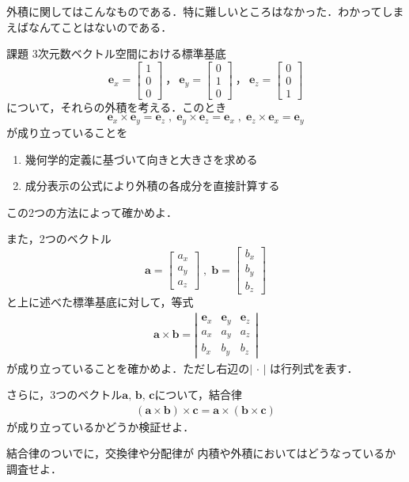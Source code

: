 外積に関してはこんなものである．特に難しいところはなかった．わかってしまえばなんてことはないのである．
\begin{itembox}[l]{課題}
3次元数ベクトル空間における標準基底
$$
\bm{e}_x = \left[
 \begin{array}{c}
 1 \\
 0 \\
 0 
 \end{array}
\right]
\: ，\: 
\bm{e}_y = \left[
 \begin{array}{c}
 0 \\
 1 \\
 0 
 \end{array}
\right]
\: ，\: 
\bm{e}_z = \left[
 \begin{array}{c}
 0 \\
 0 \\
 1 
 \end{array}
\right]
$$
について，それらの外積を考える．このとき
$$
\bm{e}_x \times \bm{e}_y = \bm{e}_z \; , \; 
\bm{e}_y \times \bm{e}_z = \bm{e}_x \; , \; 
\bm{e}_z \times \bm{e}_x = \bm{e}_y 
$$
が成り立っていることを
\begin{enumerate}
\item 幾何学的定義に基づいて向きと大きさを求める
\item 成分表示の公式により外積の各成分を直接計算する 
\end{enumerate}
この2つの方法によって確かめよ．

また，2つのベクトル
$$
\bm{a} = \left[
 \begin{array}{c}
  a_x \\ 
  a_y \\
  a_z
 \end{array}
\right]
\; , \; 
\bm{b} = \left[
 \begin{array}{c}
  b_x \\ 
  b_y \\
  b_z
 \end{array}
\right]
$$
と上に述べた標準基底に対して，等式
\begin{align}
\bm{a} \times \bm{b} = \left| 
\begin{array}{ccc}
 \bm{e}_x & \bm{e}_y & \bm{e}_z \\
 a_x & a_y & a_z \\
 b_x & b_y & b_z 
\end{array}
\right|
\label{eq:gaisekidet}
\end{align}
が成り立っていることを確かめよ．ただし右辺の$\lvert \, \cdot \, \rvert$
は行列式を表す．

さらに，3つのベクトル$\bm{a}, \, \bm{b}, \, \bm{c}$について，結合律
\begin{align}
( \bm{a} \times \bm{b} ) \times \bm{c} =\bm{a} \times ( \bm{b} \times \bm{c} )
\end{align}
が成り立っているかどうか検証せよ．

結合律のついでに，交換律や分配律が
内積や外積においてはどうなっているか調査せよ．
\end{itembox}
